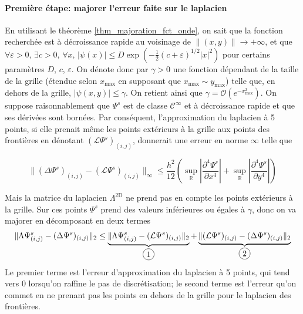 \documentclass[svgnames,dvipsnames,a4paper,10pt,french]{report}
\newcommand*\circled[1]{\tikz[baseline=(char.base)]{\node[shape=circle,draw,inner sep=2pt] (char) {#1};}}
\begin{document}
\begin{appendices}
\paragraph{Première étape: majorer l'erreur faite sur le laplacien}
 En utilisant le théorème \ref{thm_majoration_fct_onde}, on sait que la fonction recherchée est à décroissance rapide au voisinage de $\|(x,y)\| \rightarrow + \infty$, et que $\forall \varepsilon >0, \, \exists c>0, \, \forall x, \, |\psi(x)| \le D \exp(-\frac{1}{2}(c+\varepsilon)^{1/2}|x|^{2})$ pour certains paramètres $D$, $c$, $\varepsilon$. On dénote donc par $\gamma >0$ une fonction dépendant de la taille de la grille (étendue selon $x_\text{max}$ en supposant que $x_\text{max} \sim y_\text{max}$) telle que, en dehors de la grille, $|\psi(x,y)| \le \gamma$. On retient ainsi que $\gamma = \mathcal{O}(e^{-x_\text{max}^2})$. On suppose raisonnablement que $\Psi^s$ est de classe $\mathscr{C}^\infty$ et à décroissance rapide et que ses dérivées sont bornées. Par conséquent, l'approximation du laplacien à 5 points, si elle prenait même les points extérieurs à la grille aux points des frontières en dénotant $(\mathcal{L}\Psi^s)_{(i,j)}$, donnerait une erreur en norme $\infty$ telle que
    
    \begin{equation}
    \label{erreur_laplacien_complet}
        \| (\Delta\Psi^s)_{(i,j)} - (\mathcal{L}\Psi^s)_{(i,j)}\|_\infty \le \frac{h^2}{12} \left( \sup_{\mathbb{R}} \left|\frac{\partial^4 \Psi^s}{\partial x^4}\right| +\sup_{\mathbb{R}} \left|\frac{\partial^4 \Psi^s}{\partial y^4} \right| \right)
    \end{equation}
    
Mais la matrice du laplacien $\Lambda^\text{2D}$ ne prend pas en compte les points extérieurs à la grille. Sur ces points $\Psi^s$ prend des valeurs inférieures ou égales à $\gamma$, donc on va majorer en décomposant en deux termes
\begin{multline}
\label{maj_erreur_laplacien}
    \|\Lambda \Psi^s_{(i,j)} - (\Delta\Psi^s)_{(i,j)} \|_2 \le \underbrace{\|\Lambda \Psi^s_{(i,j)} - (\mathcal{L}\Psi^s)_{(i,j)} \|_2}_{\circled{1}} + \underbrace{\|(\mathcal{L}\Psi^s)_{(i,j)} - (\Delta\Psi^s)_{(i,j)} \|_2}_{\circled{2}}
\end{multline}
Le premier terme est l'erreur d'approximation du laplacien à 5 points, qui tend vers $0$ lorsqu'on raffine le pas de discrétisation; le second terme est l'erreur qu'on commet en ne prenant pas les points en dehors de la grille pour le laplacien des frontières.



\end{appendices}
\end{document}
